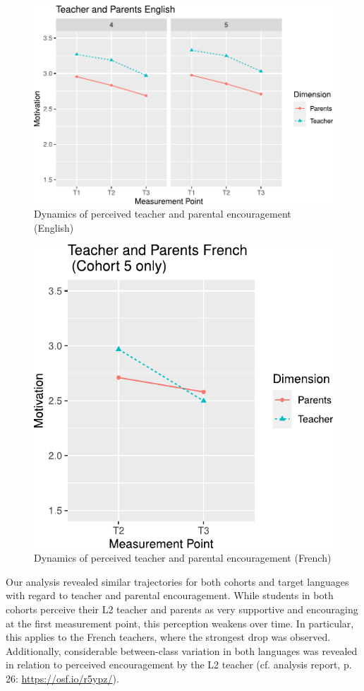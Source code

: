\documentclass[output=paper]{langsci/langscibook}
\begin{document}
  
\begin{figure}[p]
\includegraphics[width=.95\textwidth]{figures/Fig8.3.pdf}
\caption{Dynamics of perceived teacher and parental encouragement (English)\label{fig:08:3}}
\end{figure}

  
\begin{figure}[p]
\includegraphics[width=.64\textwidth]{figures/Fig8.4.pdf}
\caption{Dynamics of perceived teacher and parental encouragement (French)\label{fig:08:4}}
\end{figure}

\begin{sloppypar}
Our analysis revealed similar trajectories for both cohorts and target languages with regard to teacher and parental encouragement. While students in both cohorts perceive their L2 teacher and parents as very supportive and encouraging at the first measurement point, this perception weakens over time. In particular, this applies to the French teachers, where the strongest drop was observed. Additionally, considerable between-class variation in both languages was revealed in relation to perceived encouragement by the L2 teacher (cf. analysis report, p. 26: \url{https://osf.io/r5ypz/}).
\end{sloppypar}
\end{document}
